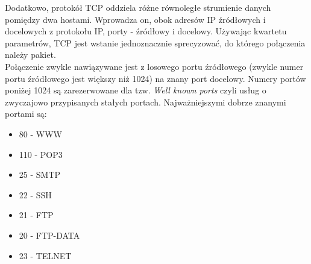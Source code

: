			Dodatkowo, protokół TCP oddziela różne równoległe strumienie danych pomiędzy dwa hostami.
			Wprowadza on, obok adresów IP źródłowych i docelowych z protokołu IP, porty - źródłowy i docelowy.
			Używając kwartetu parametrów, TCP jest wstanie jednoznacznie sprecyzować, do którego połączenia należy pakiet.\\
			Połączenie zwykle nawiązywane jest z losowego portu źródłowego (zwykle numer portu źródłowego jest większy niż 1024) na znany port docelowy.
			Numery portów poniżej 1024 są zarezerwowane dla tzw. \textit{Well known ports} czyli usług o zwyczajowo przypisanych stałych portach.
			Najważniejszymi dobrze znanymi portami są:
			\begin{itemize}
				\item 80 - WWW
				\item 110 - POP3
				\item 25 - SMTP
				\item 22 - SSH
				\item 21 - FTP
				\item 20 - FTP-DATA
				\item 23 - TELNET
			\end{itemize}
